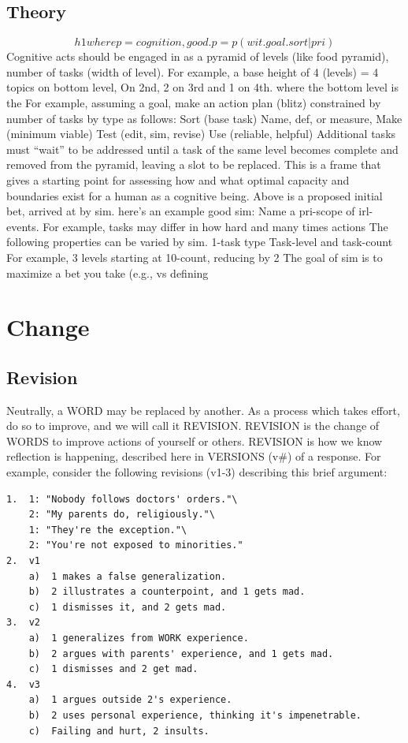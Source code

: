\documentclass[
]{book}
\begin{document}
\hypertarget{word-theory}{%
\section{Theory}\label{word-theory}}

\[ h1 where p = cognition, good.p = p(wit.goal.sort|pri) \]
Cognitive acts should be engaged in as a pyramid of levels (like food pyramid), number of tasks (width of level).
For example, a base height of 4 (levels) = 4 topics on bottom level,
On 2nd, 2 on 3rd and 1 on 4th. where the bottom level is the
For example, assuming a goal, make an action plan (blitz) constrained by number of tasks by type as follows:
Sort (base task)
Name, def, or measure,
Make (minimum viable)
Test (edit, sim, revise)
Use (reliable, helpful)
Additional tasks must ``wait'' to be addressed until a task of the same level becomes complete and removed from the pyramid, leaving a slot to be replaced.
This is a frame that gives a starting point for assessing how and what optimal capacity and boundaries exist for a human as a cognitive being.
Above is a proposed initial bet, arrived at by sim. here's an example good sim:
Name a pri-scope of irl-events.
For example, tasks may differ in how hard and many times actions
The following properties can be varied by sim. 1-task type
Task-level and task-count
For example, 3 levels starting at 10-count, reducing by 2
The goal of sim is to maximize a bet you take (e.g., vs defining

\hypertarget{change}{%
\chapter{Change}\label{change}}

\hypertarget{revision}{%
\section{Revision}\label{revision}}

Neutrally, a WORD may be replaced by another. As a process which takes effort, do so to improve, and we will call it REVISION. REVISION is the change of WORDS to improve actions of yourself or others.
REVISION is how we know reflection is happening, described here in VERSIONS (v\#) of a response.
For example, consider the following revisions (v1-3) describing this brief argument:

\begin{verbatim}
1.  1: "Nobody follows doctors' orders."\
    2: "My parents do, religiously."\
    1: "They're the exception."\
    2: "You're not exposed to minorities."  
2.  v1  
    a)  1 makes a false generalization.
    b)  2 illustrates a counterpoint, and 1 gets mad.
    c)  1 dismisses it, and 2 gets mad.  
3.  v2  
    a)  1 generalizes from WORK experience.
    b)  2 argues with parents' experience, and 1 gets mad.
    c)  1 dismisses and 2 get mad.  
4.  v3  
    a)  1 argues outside 2's experience.
    b)  2 uses personal experience, thinking it's impenetrable.
    c)  Failing and hurt, 2 insults.  
\end{verbatim}
\end{document}
